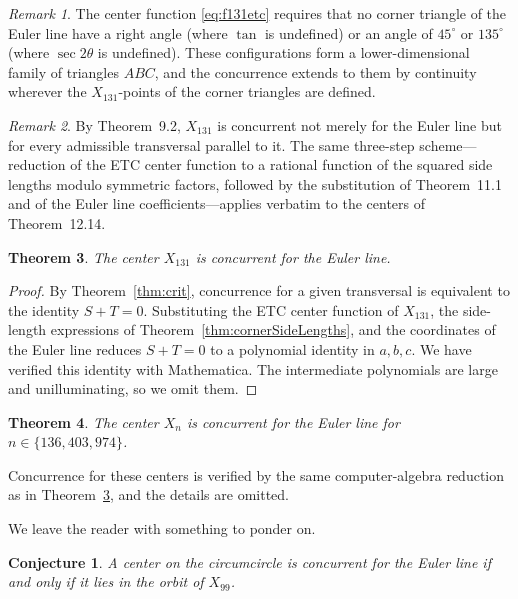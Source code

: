 \documentclass[12pt,a4paper]{amsart}
\newtheorem{theorem}{Theorem} [section]
\newtheorem{conjecture}{Conjecture}
\theoremstyle{remark}
\newtheorem{remark}[theorem]{Remark}
\begin{document}
{\begin{remark}
The center function \eqref{eq:f131etc} requires that no corner triangle
of the Euler line have a right angle (where $\tan$ is undefined) or an
angle of $45^\circ$ or $135^\circ$ (where $\sec 2\theta$ is undefined).
These configurations form a lower-dimensional family of triangles
$ABC$, and the concurrence extends to them by continuity wherever the
$X_{131}$-points of the corner triangles are defined.
\end{remark}

\begin{remark}
By Theorem~9.2, $X_{131}$ is concurrent not merely for the Euler line
but for every admissible transversal parallel to it.  The same
three-step scheme---reduction of the ETC center function to a rational
function of the squared side lengths modulo symmetric factors,
followed by the substitution of Theorem~11.1 and of the Euler line
coefficients---applies verbatim to the centers of Theorem~12.14.
\end{remark}

}

\goodbreak

\begin{theorem}\label{thm:x131}
The center $X_{131}$ is concurrent for the Euler line.
\end{theorem}

\begin{proof}
By Theorem~\ref{thm:crit}, concurrence for a given transversal is
equivalent to the identity $S+T=0$. Substituting the ETC center function of
$X_{131}$, the side-length expressions of Theorem~\ref{thm:cornerSideLengths}, and the
coordinates of the Euler line reduces $S+T=0$ to a polynomial identity in
$a,b,c$. We have verified this identity with Mathematica. The
intermediate polynomials are large and unilluminating, so we omit them.
\end{proof}

\begin{theorem}
The center $X_n$ is concurrent for the Euler line for\\
$n\in\{136, 403, 974\}$.
\end{theorem}

Concurrence for these centers is verified by the same computer-algebra reduction
as in Theorem~\ref{thm:x131}, and the details are omitted.

We leave the reader with something to ponder on.

\begin{conjecture}
\label{conj:complete}
A center on the circumcircle is concurrent for the Euler line if and
only if it lies in the orbit of $X_{99}$.
\end{conjecture}
\end{document}
